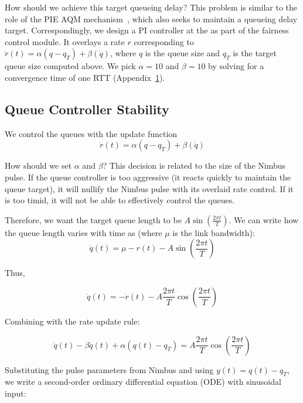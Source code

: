How should we achieve this target queueing delay? 
This problem is similar to the role of the PIE AQM mechanism~\cite{pie}, which also seeks to maintain a queueing delay target.
Correspondingly, we design a PI controller at the \inbox as part of the fairness control module. 
It overlays a rate $r$ corresponding to $\dot{r}(t) = \alpha (q - q_T) + \beta (\dot{q})$, where $q$ is the queue size and $q_T$ is the target queue size computed above.
We pick $\alpha = 10$ and $\beta = 10$ by solving for a convergence time of one RTT (Appendix~\ref{app:derive-ab}).

\begin{Appendix}
\section{Queue Controller Stability}\label{app:derive-ab}

We control the queues with the update function 
\begin{equation} 
    \dot{r}(t) = \alpha (q - q_T) + \beta (\dot{q})
\end{equation}

How should we set $\alpha$ and $\beta$? This decision is related to the size of the Nimbus pulse. 
If the queue controller is too aggressive (\ie it reacts quickly to maintain the queue target), it will nullify the Nimbus pulse with its overlaid rate control.
If it is too timid, it will not be able to effectively control the queues.

Therefore, we want the target queue length to be $A \sin(\frac{2\pi{}t}{T})$. 
We can write how the queue length varies with time as (where $\mu$ is the link bandwidth):
\begin{equation} 
    \dot{q}(t) = \mu - r(t) - A \sin(\frac{2\pi{}t}{T})
\end{equation}

\noindent Thus, 

\begin{equation}
    \ddot{q}(t) = - \dot{r}(t) - A \frac{2\pi{}t}{T} \cos(\frac{2\pi{}t}{T})
\end{equation}

\noindent Combining with the rate update rule:

\begin{equation}
    \ddot{q}(t) - \beta \dot{q}(t) + \alpha (q(t) - q_T) = A \frac{2\pi{}t}{T} \cos(\frac{2\pi{}t}{T})
\end{equation}

\noindent Substituting the pulse parameters from Nimbus and using $y(t) = q(t) - q_T$, we write a second-order ordinary differential equation (ODE) with sinusoidal input:


\end{Appendix}
